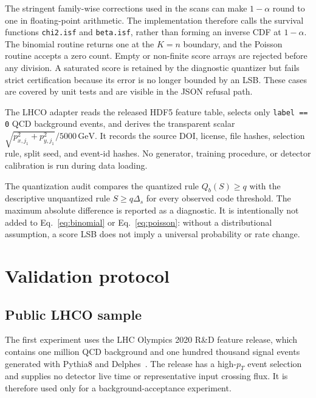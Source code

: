 \documentclass[submission, Phys]{SciPost}
\begin{document}
The stringent family-wise corrections used in the scans can make $1-\alpha$
round to one in floating-point arithmetic.  The implementation therefore calls
the survival functions \texttt{chi2.isf} and \texttt{beta.isf}, rather than
forming an inverse CDF at $1-\alpha$.  The binomial routine returns one at the
$K=n$ boundary, and the Poisson routine accepts a zero count.  Empty or
non-finite score arrays are rejected before any division.  A saturated score is
retained by the diagnostic quantizer but fails strict certification because its
error is no longer bounded by an LSB.  These cases are covered by unit tests and
are visible in the JSON refusal path.

The LHCO adapter reads the released HDF5 feature table, selects only
\verb|label == 0| QCD background events, and derives the transparent scalar
$\sqrt{p_{x,j_1}^2+p_{y,j_1}^2}/5000\,\mathrm{GeV}$.  It records the source
DOI, license, file hashes, selection rule, split seed, and event-id hashes.
No generator, training procedure, or detector calibration is run during data
loading.

The quantization audit compares the quantized rule $Q_b(S)\ge q$ with the
descriptive unquantized rule $S\ge q\Delta_s$ for every observed code
threshold.  The maximum absolute difference is reported as a diagnostic.  It
is intentionally not added to Eq.~\eqref{eq:binomial} or Eq.~\eqref{eq:poisson}:
without a distributional assumption, a score LSB does not imply a universal
probability or rate change.

\section{Validation protocol}
\label{sec:validation}

\subsection{Public LHCO sample}

The first experiment uses the LHC Olympics 2020 R\&D feature release, which
contains one million QCD background and one hundred thousand signal events
generated with Pythia8 and Delphes~\cite{Kasieczka2021LHCO,LHCO2020RND,
Sjostrand2015Pythia,deFavereau2014Delphes}.  The release has a high-$p_T$ event
selection and supplies no detector live time or representative input crossing
flux.  It is therefore used only for a background-acceptance experiment.
\end{document}
